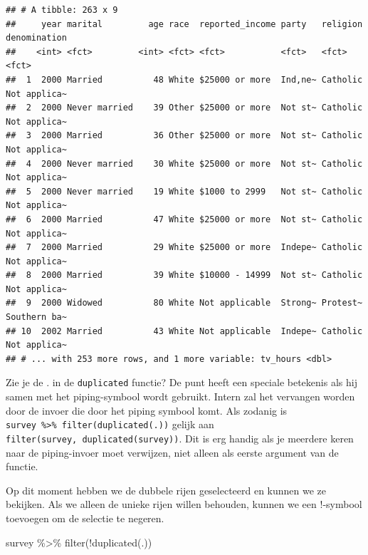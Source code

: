 \documentclass[]{tufte-book}
\newenvironment{Shaded}{}{}
\newcommand{\FunctionTok}[1]{\textcolor[rgb]{0.02,0.16,0.49}{#1}}
\newcommand{\NormalTok}[1]{#1}
\newcommand{\SpecialCharTok}[1]{\textcolor[rgb]{0.25,0.44,0.63}{#1}}
\begin{document}
\begin{verbatim}
## # A tibble: 263 x 9
##     year marital         age race  reported_income party   religion denomination
##    <int> <fct>         <int> <fct> <fct>           <fct>   <fct>    <fct>       
##  1  2000 Married          48 White $25000 or more  Ind,ne~ Catholic Not applica~
##  2  2000 Never married    39 Other $25000 or more  Not st~ Catholic Not applica~
##  3  2000 Married          36 Other $25000 or more  Not st~ Catholic Not applica~
##  4  2000 Never married    30 White $25000 or more  Not st~ Catholic Not applica~
##  5  2000 Never married    19 White $1000 to 2999   Not st~ Catholic Not applica~
##  6  2000 Married          47 White $25000 or more  Not st~ Catholic Not applica~
##  7  2000 Married          29 White $25000 or more  Indepe~ Catholic Not applica~
##  8  2000 Married          39 White $10000 - 14999  Not st~ Catholic Not applica~
##  9  2000 Widowed          80 White Not applicable  Strong~ Protest~ Southern ba~
## 10  2002 Married          43 White Not applicable  Indepe~ Catholic Not applica~
## # ... with 253 more rows, and 1 more variable: tv_hours <dbl>
\end{verbatim}

Zie je de . in de \texttt{duplicated} functie? De punt heeft een speciale betekenis als hij samen met het piping-symbool wordt gebruikt. Intern zal het vervangen worden door de invoer die door het piping symbool komt. Als zodanig is \texttt{survey\ \%\textgreater{}\%\ filter(duplicated(.))} gelijk aan \texttt{filter(survey,\ duplicated(survey))}. Dit is erg handig als je meerdere keren naar de piping-invoer moet verwijzen, niet alleen als eerste argument van de functie.

Op dit moment hebben we de dubbele rijen geselecteerd en kunnen we ze bekijken. Als we alleen de unieke rijen willen behouden, kunnen we een !-symbool toevoegen om de selectie te negeren.

\begin{Shaded}
\begin{Highlighting}[]
\NormalTok{survey }\SpecialCharTok{\%\textgreater{}\%}
  \FunctionTok{filter}\NormalTok{(}\SpecialCharTok{!}\FunctionTok{duplicated}\NormalTok{(.))}
\end{Highlighting}
\end{Shaded}
\end{document}

